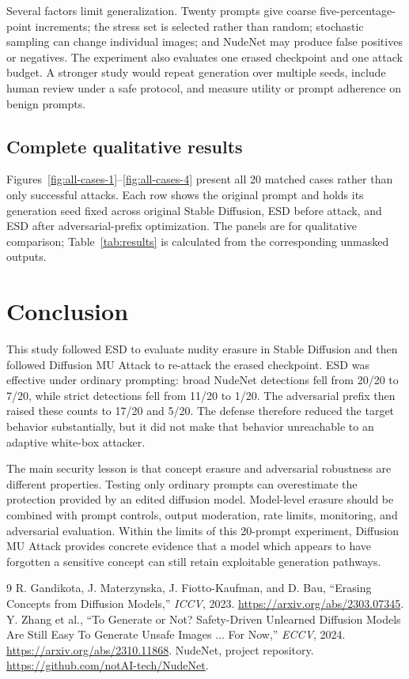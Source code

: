 \documentclass[11pt,a4paper]{article}
\begin{document}
Several factors limit generalization. Twenty prompts give coarse five-percentage-point increments; the stress set is selected rather than random; stochastic sampling can change individual images; and NudeNet may produce false positives or negatives. The experiment also evaluates one erased checkpoint and one attack budget. A stronger study would repeat generation over multiple seeds, include human review under a safe protocol, and measure utility or prompt adherence on benign prompts.

\subsection{Complete qualitative results}
Figures~\ref{fig:all-cases-1}--\ref{fig:all-cases-4} present all 20 matched cases rather than only successful attacks. Each row shows the original prompt and holds its generation seed fixed across original Stable Diffusion, ESD before attack, and ESD after adversarial-prefix optimization. The panels are for qualitative comparison; Table~\ref{tab:results} is calculated from the corresponding unmasked outputs.


\section{Conclusion}
This study followed ESD to evaluate nudity erasure in Stable Diffusion and then followed Diffusion MU Attack to re-attack the erased checkpoint. ESD was effective under ordinary prompting: broad NudeNet detections fell from 20/20 to 7/20, while strict detections fell from 11/20 to 1/20. The adversarial prefix then raised these counts to 17/20 and 5/20. The defense therefore reduced the target behavior substantially, but it did not make that behavior unreachable to an adaptive white-box attacker.

The main security lesson is that concept erasure and adversarial robustness are different properties. Testing only ordinary prompts can overestimate the protection provided by an edited diffusion model. Model-level erasure should be combined with prompt controls, output moderation, rate limits, monitoring, and adversarial evaluation. Within the limits of this 20-prompt experiment, Diffusion MU Attack provides concrete evidence that a model which appears to have forgotten a sensitive concept can still retain exploitable generation pathways.

\begin{thebibliography}{9}
 R. Gandikota, J. Materzynska, J. Fiotto-Kaufman, and D. Bau, ``Erasing Concepts from Diffusion Models,'' \emph{ICCV}, 2023. \url{https://arxiv.org/abs/2303.07345}.
 Y. Zhang et al., ``To Generate or Not? Safety-Driven Unlearned Diffusion Models Are Still Easy To Generate Unsafe Images ... For Now,'' \emph{ECCV}, 2024. \url{https://arxiv.org/abs/2310.11868}.
 NudeNet, project repository. \url{https://github.com/notAI-tech/NudeNet}.
\end{thebibliography}
\end{document}
